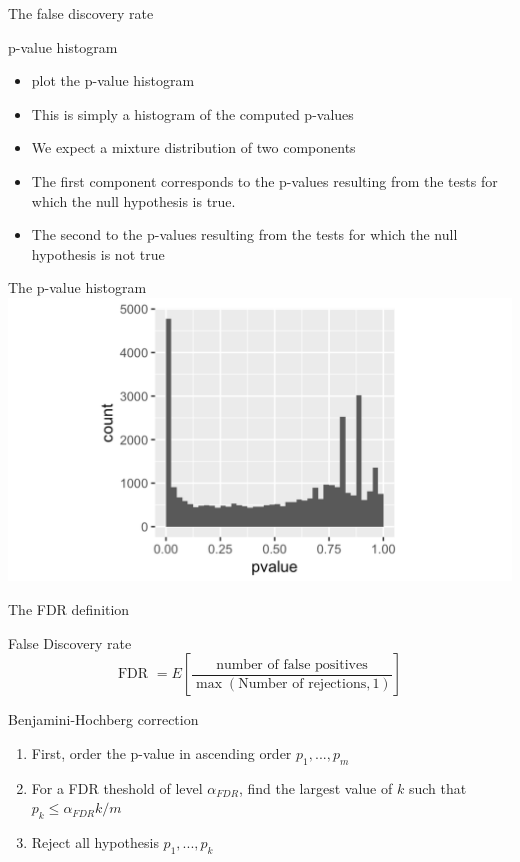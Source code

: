 \documentclass{bredelebeamer}
\begin{document}
\begin{frame}{The false discovery rate }
\begin{block}{p-value histogram}
\begin{itemize}
\item plot the p-value histogram
\item This is simply a histogram of the computed p-values
\item We expect a mixture distribution of two components
\item The first component corresponds to the p-values resulting from the tests for which the null hypothesis is true.
\item The second to the p-values resulting from the tests for which the null hypothesis is not true
\end{itemize}

\end{block}
\end{frame}
\begin{frame}{The p-value histogram}
\includegraphics[width=1\textwidth]{pvaluehist}
\end{frame}
\begin{frame}{The FDR definition}
\begin{block}{False Discovery rate}
\begin{equation}
	\text{FDR } = E\left[\frac{\text{number of false positives}}{\max(\text{Number of rejections},1)} \right]
\end{equation}
\end{block}{Benjamini-Hochberg correction}
\begin{enumerate}
\item First, order the p-value in ascending order $p_1,..., p_m$
\item For a FDR theshold of level $\alpha_{FDR}$, find the largest value of $k$ such that $p_k \leq \alpha_{FDR} k /m$
\item Reject all hypothesis $p_1,...,p_k$
\end{enumerate}
\end{frame}
\end{document}
